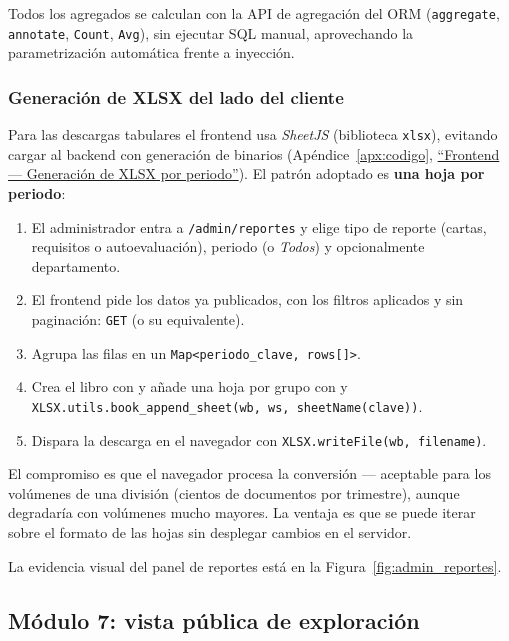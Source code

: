Todos los agregados se calculan con la API de agregación del ORM (\texttt{aggregate}, \texttt{annotate}, \texttt{Count}, \texttt{Avg}), sin ejecutar SQL manual, aprovechando la parametrización automática frente a inyección.

\subsubsection{Generación de XLSX del lado del cliente}

Para las descargas tabulares el frontend usa \emph{SheetJS} (biblioteca \texttt{xlsx}), evitando cargar al backend con generación de binarios (Apéndice~\ref{apx:codigo}, \hyperref[lst:xlsx_por_periodo]{``Frontend --- Generación de XLSX por periodo''}). El patrón adoptado es \textbf{una hoja por periodo}:

\begin{enumerate}
    \item El administrador entra a \texttt{/admin/reportes} y elige tipo de reporte (cartas, requisitos o autoevaluación), periodo (o \emph{Todos}) y opcionalmente departamento.
    \item El frontend pide los datos ya publicados, con los filtros aplicados y sin paginación: \texttt{GET}  (o su equivalente).
    \item Agrupa las filas en un \texttt{Map<periodo\_clave, rows[]>}.
    \item Crea el libro con  y añade una hoja por grupo con  y \texttt{XLSX.utils.book\_append\_sheet(wb, ws, sheetName(clave))}.
    \item Dispara la descarga en el navegador con \texttt{XLSX.writeFile(wb, filename)}.
\end{enumerate}

El compromiso es que el navegador procesa la conversión --- aceptable para los volúmenes de una división (cientos de documentos por trimestre), aunque degradaría con volúmenes mucho mayores. La ventaja es que se puede iterar sobre el formato de las hojas sin desplegar cambios en el servidor.

La evidencia visual del panel de reportes está en la Figura~\ref{fig:admin_reportes}.

\subsection{Módulo 7: vista pública de exploración}

